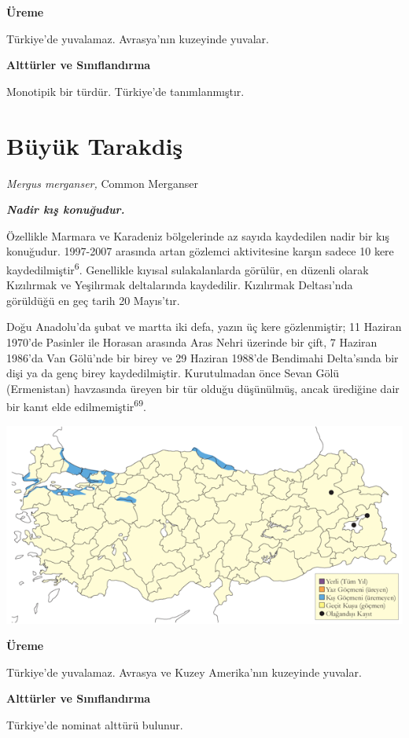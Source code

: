 \documentclass[
  letterpaper,
  DIV=11,
  numbers=noendperiod]{scrreprt}
\begin{document}
\textbf{Üreme}

Türkiye'de yuvalamaz. Avrasya'nın kuzeyinde yuvalar.

\textbf{Alttürler ve Sınıflandırma}

Monotipik bir türdür. Türkiye'de tanımlanmıştır.

\section{Büyük Tarakdiş}\label{buxfcyuxfck-tarakdiux15f}

\emph{Mergus merganser,} Common Merganser

\textbf{\emph{Nadir kış konuğudur.}}

Özellikle Marmara ve Karadeniz bölgelerinde az sayıda kaydedilen nadir
bir kış konuğudur. 1997-2007 arasında artan gözlemci aktivitesine karşın
sadece 10 kere kaydedilmiştir\textsuperscript{6}. Genellikle kıyısal
sulakalanlarda görülür, en düzenli olarak Kızılırmak ve Yeşilırmak
deltalarında kaydedilir. Kızılırmak Deltası'nda görüldüğü en geç tarih
20 Mayıs'tır.

Doğu Anadolu'da şubat ve martta iki defa, yazın üç kere gözlenmiştir; 11
Haziran 1970'de Pasinler ile Horasan arasında Aras Nehri üzerinde bir
çift, 7 Haziran 1986'da Van Gölü'nde bir birey ve 29 Haziran 1988'de
Bendimahi Delta'sında bir dişi ya da genç birey kaydedilmiştir.
Kurutulmadan önce Sevan Gölü (Ermenistan) havzasında üreyen bir tür
olduğu düşünülmüş, ancak ürediğine dair bir kanıt elde
edilmemiştir\textsuperscript{69}.

\includegraphics{images/harita_Page_033.png}

\textbf{Üreme}

Türkiye'de yuvalamaz. Avrasya ve Kuzey Amerika'nın kuzeyinde yuvalar.

\textbf{Alttürler ve Sınıflandırma}

Türkiye'de nominat alttürü bulunur.
\end{document}
